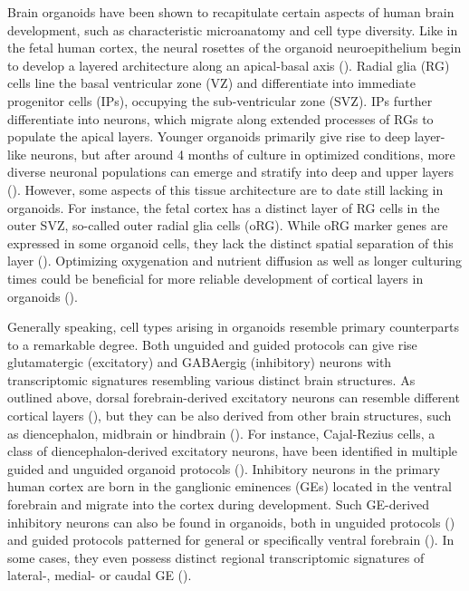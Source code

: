 Brain organoids have been shown to recapitulate certain aspects of human brain development, such as characteristic microanatomy and cell type diversity. Like in the fetal human cortex, the neural rosettes of the organoid neuroepithelium begin to develop a layered architecture along an apical-basal axis (\cite{kadoshima_self-organization_2013,lancaster_cerebral_2013}). Radial glia (RG) cells line the basal ventricular zone (VZ) and differentiate into immediate progenitor cells (IPs), occupying the sub-ventricular zone (SVZ). IPs further differentiate into neurons, which migrate along extended processes of RGs to populate the apical layers. Younger organoids primarily give rise to deep layer-like neurons, but after around 4 months of culture in optimized conditions, more diverse neuronal populations can emerge and stratify into deep and upper layers (\cite{kanton_organoid_2019,qian_sliced_2020}). However, some aspects of this tissue architecture are to date still lacking in organoids. For instance, the fetal cortex has a distinct layer of RG cells in the outer SVZ, so-called outer radial glia cells (oRG). While oRG marker genes are expressed in some organoid cells, they lack the distinct spatial separation of this layer (\cite{bhaduri_cell_2020}). Optimizing oxygenation and nutrient diffusion as well as longer culturing times could be beneficial for more reliable development of cortical layers in organoids (\cite{bhaduri_cell_2020,chiaradia_brain_2020}).

Generally speaking, cell types arising in organoids resemble primary counterparts to a remarkable degree. Both unguided and guided protocols can give rise glutamatergic (excitatory) and GABAergig (inhibitory) neurons with transcriptomic signatures resembling various distinct brain structures. As outlined above, dorsal forebrain-derived excitatory neurons can resemble different cortical layers (\cite{kanton_organoid_2019,qian_sliced_2020}), but they can be also derived from other brain structures, such as diencephalon, midbrain or hindbrain (\cite{kanton_organoid_2019}). For instance, Cajal-Rezius cells, a class of diencephalon-derived excitatory neurons, have been identified in multiple guided and unguided organoid protocols (\cite{kanton_organoid_2019,velasco_individual_2019}). Inhibitory neurons in the primary human cortex are born in the ganglionic eminences (GEs) located in the ventral forebrain and migrate into the cortex during development. Such GE-derived inhibitory neurons can also be found in organoids, both in unguided protocols (\cite{kanton_organoid_2019}) and guided protocols patterned for general or specifically ventral forebrain (\cite{velasco_individual_2019,birey_assembly_2017,miura_generation_2020}). In some cases, they even possess distinct regional transcriptomic signatures of lateral-, medial- or caudal GE (\cite{kanton_organoid_2019,miura_generation_2020}). 

